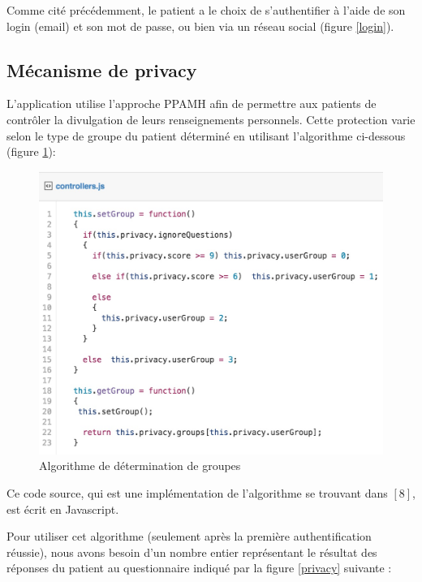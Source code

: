 Comme cité précédemment, le patient a le choix de s'authentifier à l'aide de son login (email) et son mot de passe, ou bien via un réseau social (figure \ref{login}).

\subsection{Mécanisme de privacy}

L'application utilise l'approche PPAMH afin de permettre aux patients de contrôler la divulgation de leurs renseignements personnels. Cette protection varie selon le type de groupe du patient déterminé en utilisant l'algorithme ci-dessous (figure \ref{code}):

\begin{figure}[!ht]
\begin{center}
\includegraphics[scale=0.55]{code.jpg}
\caption{Algorithme de détermination de groupes}
\label{code}
\end{center}
\end{figure}

Ce code source, qui est une implémentation de l'algorithme se trouvant dans $[8]$, est écrit en Javascript.

\vspace{6pt}
\paragraphmark

Pour utiliser cet algorithme (seulement après la première authentification réussie), nous avons besoin d'un nombre entier représentant le résultat des réponses du patient au questionnaire indiqué par la figure \ref{privacy} suivante :


